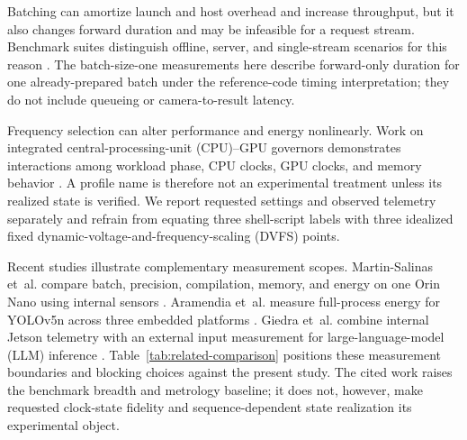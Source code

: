 \documentclass[electronics,article,submit,pdftex,moreauthors]{Definitions/mdpi}
\newcommand{\etal}{et~al.}
\renewcommand{\tabref}[1]{Table~\ref{#1}}
\begin{document}
Batching can amortize launch and host overhead and increase throughput, but it also changes forward duration and may be infeasible for a request stream. Benchmark suites distinguish offline, server, and single-stream scenarios for this reason \cite{reddi2020mlperf,banbury2021mlperf}. The batch-size-one measurements here describe forward-only duration for one already-prepared batch under the reference-code timing interpretation; they do not include queueing or camera-to-result latency.

Frequency selection can alter performance and energy nonlinearly. Work on integrated central-processing-unit (CPU)--GPU governors demonstrates interactions among workload phase, CPU clocks, GPU clocks, and memory behavior \cite{karzhaubayeva2023cnn}. A profile name is therefore not an experimental treatment unless its realized state is verified. We report requested settings and observed telemetry separately and refrain from equating three shell-script labels with three idealized fixed dynamic-voltage-and-frequency-scaling (DVFS) points.

Recent studies illustrate complementary measurement scopes. Martin-Salinas \etal{} compare batch, precision, compilation, memory, and energy on one Orin Nano using internal sensors \cite{martinsalinas2025}. Aramendia \etal{} measure full-process energy for YOLOv5n across three embedded platforms \cite{aramendia2025}. Giedra \etal{} combine internal Jetson telemetry with an external input measurement for large-language-model (LLM) inference \cite{giedra2026}. \tabref{tab:related-comparison} positions these measurement boundaries and blocking choices against the present study. The cited work raises the benchmark breadth and metrology baseline; it does not, however, make requested clock-state fidelity and sequence-dependent state realization its experimental object.
\end{document}
